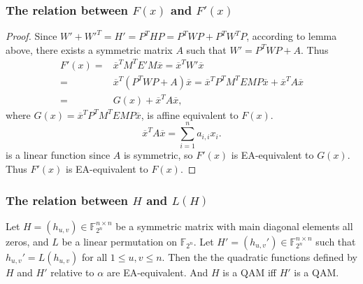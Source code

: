\documentclass[
    aspectratio=169,                   %
]{beamer}
\newcommand{\F}{\mathbb{F}}
\begin{document}
    \begin{frame}
        \frametitle{The relation between $ F(x) $ and $ F'(x) $}
        \begin{proof}
            
            Since $ W'+W'^T=H'=P^THP=P^TWP+P^TW^TP $, according to lemma above, there exists a symmetric matrix $ A $ 
            such that $ W'=P^TWP+A $. Thus
            \begin{align*}
                F'(x)=&\overline{x}^T M^T E'M\overline{x}=\overline{x}^T W'\overline{x}\\
                =&\overline{x}^T (P^TWP+A)\overline{x}=\overline{x}^T P^TM^TEMP\overline{x}+\overline{x}^T A\overline{x}\\
                =&G(x)+\overline{x}^T A\overline{x},
            \end{align*}
            where $ G(x)=\overline{x}^T P^TM^TEMP\overline{x} $, is affine equivalent to $ F(x) $.
            \[\overline{x}^T A\overline{x}=\sum_{i=1}^{n}a_{i,i}x_i.\]
            is a linear function since $ A $ is symmetric, so $ F'(x) $ is EA-equivalent to $G(x)$.
            Thus $F'(x)$ is EA-equivalent to $F(x)$.
        \end{proof}
    \end{frame}
    
    \begin{frame}
        \frametitle{The relation between $ H $ and $ L(H) $}
        
        \begin{theorem}
            
            Let $H =(h_{u,v}) \in \F_{2^n}^{n\times n}$ be a symmetric matrix with main diagonal elements
            all zeros, and $L$ be a linear permutation on $\F_{2^n}$. Let $H' =(h_{u,v}') \in \F_{2^n}^{n\times n}$
            such that $ h_{u,v}'=L(h_{u,v}) $ for all $ 1\le u,v\le n $. Then the the quadratic functions 
            defined by $H$ and $H'$ relative to $ \alpha $ are EA-equivalent. And $ H $ is a QAM iff $ H' $ is a QAM.
        \end{theorem}
       
    \end{frame}
    
\end{document}
